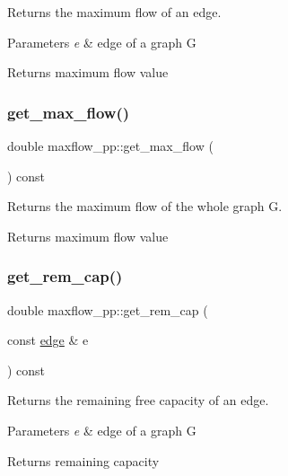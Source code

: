 Returns the maximum flow of an edge.


\begin{DoxyParams}{Parameters}
{\em e} & edge of a graph {\ttfamily G} \\
\hline
\end{DoxyParams}
\begin{DoxyReturn}{Returns}
maximum flow value 
\end{DoxyReturn}
\mbox{\label{classmaxflow__pp_a72210f8ac7aeca0a58e7407681003083}} 
\subsubsection{\texorpdfstring{get\+\_\+max\+\_\+flow()}{get\_max\_flow()}\hspace{0.1cm}{\footnotesize\ttfamily [2/2]}}
{\footnotesize\ttfamily double maxflow\+\_\+pp\+::get\+\_\+max\+\_\+flow (\begin{DoxyParamCaption}{ }\end{DoxyParamCaption}) const}

Returns the maximum flow of the whole graph {\ttfamily G}.

\begin{DoxyReturn}{Returns}
maximum flow value 
\end{DoxyReturn}
\mbox{\label{classmaxflow__pp_ab3af0c0568ff2c8295166bfd75736169}} 
\subsubsection{\texorpdfstring{get\+\_\+rem\+\_\+cap()}{get\_rem\_cap()}}
{\footnotesize\ttfamily double maxflow\+\_\+pp\+::get\+\_\+rem\+\_\+cap (\begin{DoxyParamCaption}\item[{const \mbox{\hyperlink{classedge}{edge}} \&}]{e }\end{DoxyParamCaption}) const}

Returns the remaining free capacity of an edge.


\begin{DoxyParams}{Parameters}
{\em e} & edge of a graph G \\
\hline
\end{DoxyParams}
\begin{DoxyReturn}{Returns}
remaining capacity 
\end{DoxyReturn}
\mbox{\label{classmaxflow__pp_a2179764baf624f1414211f3a7181b1a0}} 
